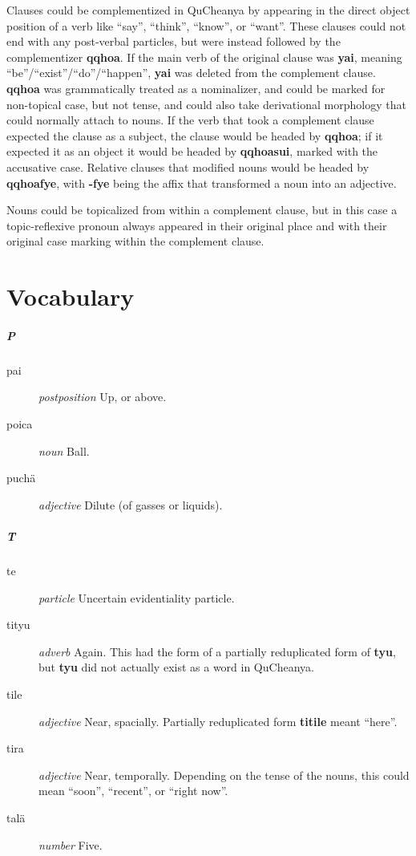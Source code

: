 \documentclass{article}
\begin{document}
Clauses could be complementized in QuCheanya by appearing in the direct object position of a verb like ``say'', ``think'', ``know'', or ``want''.  These clauses could not end with any post-verbal particles, but were instead followed by the complementizer \textbf{qqhoa}.  If the main verb of the original clause was \textbf{yai}, meaning ``be''/``exist''/``do''/``happen'', \textbf{yai} was deleted from the complement clause. \textbf{qqhoa} was grammatically treated as a nominalizer, and could be marked for non-topical case, but not tense, and could also take derivational morphology that could normally attach to nouns.  If the verb that took a complement clause expected the clause as a subject, the clause would be headed by \textbf{qqhoa}; if it expected it as an object it would be headed by \textbf{qqhoasui}, marked with the accusative case.  Relative clauses that modified nouns would be headed by \textbf{qqhoafye}, with \textbf{-fye} being the affix that transformed a noun into an adjective.

Nouns could be topicalized from within a complement clause, but in this case a topic-reflexive pronoun always appeared in their original place and with their original case marking within the complement clause.

\part{Vocabulary}

\subsubsection{P}

\begin{description}
\item [pai] \emph{postposition} Up, or above.
\item [poica] \emph{noun} Ball.
\item [puch\"a] \emph{adjective} Dilute (of gasses or liquids).
\end{description}

\subsubsection{T}

\begin{description}
\item [te] \emph{particle} Uncertain evidentiality particle.
\item [tityu] \emph{adverb} Again.  This had the form of a partially reduplicated form of \textbf{tyu}, but \textbf{tyu} did not actually exist as a word in QuCheanya.
\item [tile] \emph{adjective} Near, spacially.  Partially reduplicated form \textbf{titile} meant ``here''.
\item [tira] \emph{adjective} Near, temporally.  Depending on the tense of the nouns, this could mean ``soon'', ``recent'', or ``right now''.
\item [tal\"a] \emph{number} Five.
\end{description}
\end{document}
